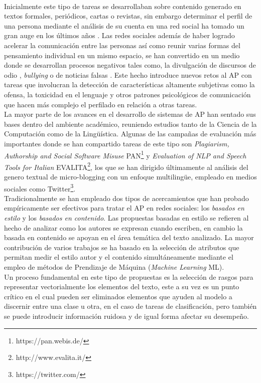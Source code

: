 \\
Inicialmente este tipo de tareas se desarrollaban sobre contenido generado en textos formales, periódicos, cartas o revistas, sin embargo determinar el perfil de una persona mediante el análisis de su cuenta en una red social ha tomado un gran auge en los últimos años \citep{rangel:2018,rangel:2019,f6032ffbacb14369b7a45d1ba9bd0b8c}.
 Las redes sociales además de haber logrado acelerar la comunicación entre las personas así como reunir varias formas del pensamiento individual en un mismo espacio, se han convertido en un medio donde se desarrollan procesos negativos tales como, la divulgación de discursos de odio \citep{}, \textit{bullying} o de noticias falsas \citep{rangel:2020}. Este hecho introduce nuevos retos al AP con tareas que involucran la detección de características altamente subjetivas como la ofensa, la toxicidad en el lenguaje y otros patrones psicológicos de comunicación que hacen más complejo el perfilado en relación a otras tareas.  
\\
 La mayor parte de los avances en el desarrollo de sistemas de AP han sentado sus bases dentro del ambiente académico, reuniendo estudios tanto de la Ciencia de la Computación como de la Lingüística. Algunas de las campañas de evaluación más importantes donde se han compartido tareas de este tipo son \textit{Plagiarism, Authorship and Social Software Misuse} PAN\footnote{https://pan.webis.de/} y \textit{Evaluation of NLP and Speech Tools for Italian} EVALITA\footnote{http://www.evalita.it/}, los que se han dirigido últimamente al análisis del genero textual de micro-blogging  con un enfoque multilingüe, empleado en medios sociales como Twitter\footnote{https://twitter.com/}.
\\
Tradicionalmente se han empleado dos tipos de acercamientos que han probado empíricamente ser efectivos para tratar el AP en redes sociales: los \textit{basados en estilo}  y los \textit{basados en contenido}. Las propuestas basadas en estilo se refieren al hecho de analizar como los autores se expresan cuando escriben, en cambio la basada en contenido se apoyan en el área temática del texto analizado. La mayor contribución de varios trabajos se ha basado en la selección de atributos que permitan medir el estilo autor y el contenido simultáneamente mediante el empleo de métodos de Prendizaje de Máquina (\textit{Machine Learning} ML).
\\
Un proceso fundamental en este tipo de propuestas es la selección de rasgos para representar vectorialmente los elementos del texto, este a su vez es un punto crítico en el cual pueden ser eliminados elementos que ayuden al modelo a discernir entre una clase u otra, en el caso de tareas de clasificación, pero también se puede introducir información ruidosa y de igual forma afectar su desempeño. 
